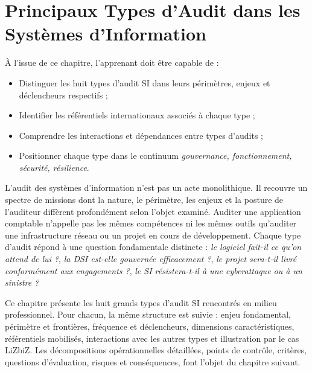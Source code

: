 
\chapter{Principaux Types d'Audit dans les Systèmes d'Information}\label{chap:05_types_audits}

\begin{boxobjectifs}
À l'issue de ce chapitre, l'apprenant doit être capable de :
\begin{itemize}
    \item Distinguer les huit types d'audit SI dans leurs périmètres, enjeux et déclencheurs respectifs ;
    \item Identifier les référentiels internationaux associés à chaque type ;
    \item Comprendre les interactions et dépendances entre types d'audits ;
    \item Positionner chaque type dans le continuum \textit{gouvernance, fonctionnement, sécurité, résilience}.
\end{itemize}
\end{boxobjectifs}

L'audit des systèmes d'information n'est pas un acte monolithique. Il recouvre un spectre de missions dont la nature, le périmètre, les enjeux et la posture de l'auditeur diffèrent profondément selon l'objet examiné. Auditer une application comptable n'appelle pas les mêmes compétences ni les mêmes outils qu'auditer une infrastructure réseau ou un projet en cours de développement. Chaque type d'audit répond à une question fondamentale distincte : \textit{le logiciel fait-il ce qu'on attend de lui ?}, \textit{la DSI est-elle gouvernée efficacement ?}, \textit{le projet sera-t-il livré conformément aux engagements ?}, \textit{le SI résistera-t-il à une cyberattaque ou à un sinistre ?}

Ce chapitre présente les huit grands types d'audit SI rencontrés en milieu professionnel. Pour chacun, la même structure est suivie : enjeu fondamental, périmètre et frontières, fréquence et déclencheurs, dimensions caractéristiques, référentiels mobilisés, interactions avec les autres types et illustration par le cas LiZbiZ. Les décompositions opérationnelles détaillées, points de contrôle, critères, questions d'évaluation, risques et conséquences, font l'objet du chapitre suivant.

